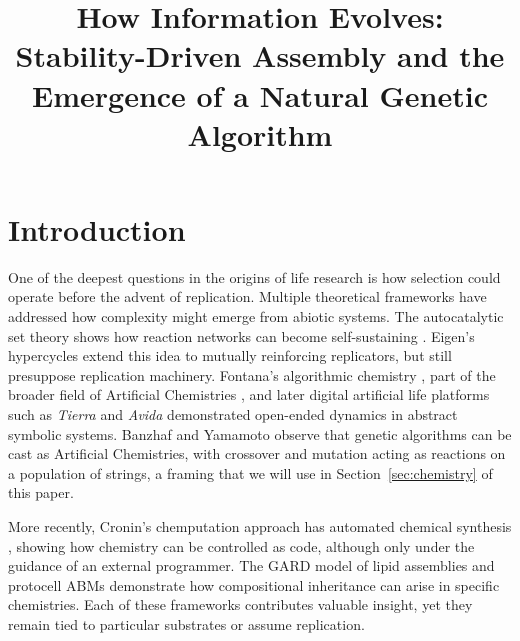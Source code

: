 \documentclass{artificial-life}
\title{How Information Evolves: Stability-Driven Assembly and the Emergence of a Natural Genetic Algorithm}
\let\cite\citep
\begin{document}
\coverpage           %
\linenumbers         %
\doublespacing       %





\section{Introduction}

One of the deepest questions in the origins of life research is how selection could operate before the advent of replication. Multiple theoretical frameworks have addressed how complexity might emerge from abiotic systems. The autocatalytic set theory shows how reaction networks can become self-sustaining \cite{kauffman1986autocatalytic, hordijk2011required}. Eigen's hypercycles \cite{eigen1979hypercycle} extend this idea to mutually reinforcing replicators, but still presuppose replication machinery. Fontana's algorithmic chemistry \cite{fontana1991algorithmic}, part of the broader field of Artificial Chemistries \cite{dittrich2001artificial,banzhaf2015artificial}, and later digital artificial life platforms such as \textit{Tierra} and \textit{Avida} \cite{ray1992tierra,adami1994avida} demonstrated open-ended dynamics in abstract symbolic systems. Banzhaf and Yamamoto \cite{banzhaf2015artificial} observe that genetic algorithms can be cast as Artificial Chemistries, with crossover and mutation acting as reactions on a population of strings, a framing that we will use in Section~\ref{sec:chemistry} of this paper.

More recently, Cronin's chemputation approach has automated chemical synthesis \cite{cronin2024chemputation}, showing how chemistry can be controlled as code, although only under the guidance of an external programmer. The GARD model of lipid assemblies \cite{segre2000compositional,markovitch2012universal} and protocell ABMs \cite{damer2015coupled} demonstrate how compositional inheritance can arise in specific chemistries. Each of these frameworks contributes valuable insight, yet they remain tied to particular substrates or assume replication.
\end{document}
